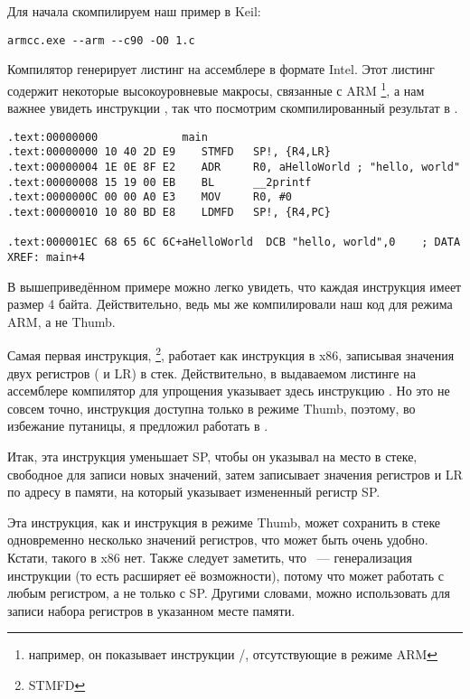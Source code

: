 \subsectionold{\NonOptimizingKeilVI (\ARMMode)}

Для начала скомпилируем наш пример в Keil:

\begin{lstlisting}
armcc.exe --arm --c90 -O0 1.c 
\end{lstlisting}

\myindex{\IntelSyntax}
Компилятор  генерирует листинг на ассемблере в формате Intel.
Этот листинг содержит некоторые высокоуровневые макросы, связанные с ARM
\footnote{например, он показывает инструкции \PUSH/\POP, отсутствующие в режиме ARM},
а нам важнее увидеть инструкции , так что посмотрим скомпилированный результат в \IDA.

\begin{lstlisting}[caption=\NonOptimizingKeilVI (\ARMMode) \IDA]
.text:00000000             main
.text:00000000 10 40 2D E9    STMFD   SP!, {R4,LR}
.text:00000004 1E 0E 8F E2    ADR     R0, aHelloWorld ; "hello, world"
.text:00000008 15 19 00 EB    BL      __2printf
.text:0000000C 00 00 A0 E3    MOV     R0, #0
.text:00000010 10 80 BD E8    LDMFD   SP!, {R4,PC}

.text:000001EC 68 65 6C 6C+aHelloWorld  DCB "hello, world",0    ; DATA XREF: main+4
\end{lstlisting}

В вышеприведённом примере можно легко увидеть, что каждая инструкция имеет размер 4 байта.
Действительно, ведь мы же компилировали наш код для режима ARM, а не Thumb.

Самая первая инструкция, \footnote{\ac{STMFD}},
работает как инструкция \PUSH в x86, записывая значения двух регистров ( и \ac{LR}) в стек.
Действительно, в выдаваемом листинге на ассемблере компилятор  для упрощения указывает здесь инструкцию
.
Но это не совсем точно, инструкция \PUSH доступна только в режиме Thumb, поэтому,
во избежание путаницы, я предложил работать в \IDA.

Итак, эта инструкция уменьшает \ac{SP}, чтобы он указывал на место в стеке, свободное для записи
новых значений, затем записывает значения регистров  и \ac{LR} 
по адресу в памяти, на который указывает измененный регистр \ac{SP}.

Эта инструкция, как и инструкция \PUSH в режиме Thumb, может сохранить в стеке одновременно несколько значений регистров, что может быть очень удобно.
Кстати, такого в x86 нет.
Также следует заметить, что ~--- генерализация инструкции \PUSH (то есть расширяет её возможности), потому что может работать с любым регистром, а не только с \ac{SP}.
Другими словами,  можно использовать для записи набора регистров в указанном месте памяти.

